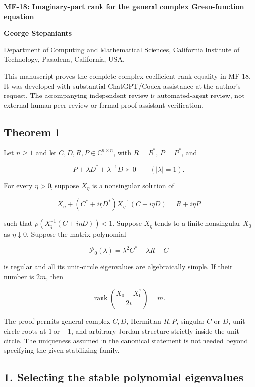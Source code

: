 \documentclass[10pt,a4paper]{article}
\begin{document}
{\raggedright\Large\bfseries MF-18: Imaginary-part rank for the general
complex Green-function equation\par}
\vspace{0.4em}
{\normalsize\bfseries George Stepaniants\par}
{\small Department of Computing and Mathematical Sciences, California
Institute of Technology, Pasadena, California, USA.\par}
\vspace{0.6em}
This manuscript proves the complete complex-coefficient rank equality in
MF-18. It was developed with substantial ChatGPT/Codex assistance at the
author's request. The accompanying independent review is automated-agent
review, not external human peer review or formal proof-assistant
verification.

\subsection{Theorem 1}\label{theorem-1}

Let \(n\geq1\) and let \(C,D,R,P\in\mathbb C^{n\times n}\), with
\(R=R^*\), \(P=P^*\), and

\[
P+\lambda D^*+\lambda^{-1}D\succ0\qquad(|\lambda|=1).
\]

For every \(\eta>0\), suppose \(X_\eta\) is a nonsingular solution of

\[
X_\eta+(C^*+i\eta D^*)X_\eta^{-1}(C+i\eta D)=R+i\eta P
\]

such that \(\rho(X_\eta^{-1}(C+i\eta D))<1\). Suppose \(X_\eta\) tends
to a finite nonsingular \(X_0\) as \(\eta\downarrow0\). Suppose the
matrix polynomial

\[
\mathcal P_0(\lambda)=\lambda^2C^*-\lambda R+C
\]

is regular and all its unit-circle eigenvalues are algebraically simple.
If their number is \(2m\), then

\[
\boxed{\operatorname{rank}\left(\frac{X_0-X_0^*}{2i}\right)=m.}
\]

The proof permits general complex \(C,D\), Hermitian \(R,P\), singular
\(C\) or \(D\), unit-circle roots at \(1\) or \(-1\), and arbitrary
Jordan structure strictly inside the unit circle. The uniqueness assumed
in the canonical statement is not needed beyond specifying the given
stabilizing family.

\subsection{1. Selecting the stable polynomial
eigenvalues}\label{selecting-the-stable-polynomial-eigenvalues}
\end{document}
